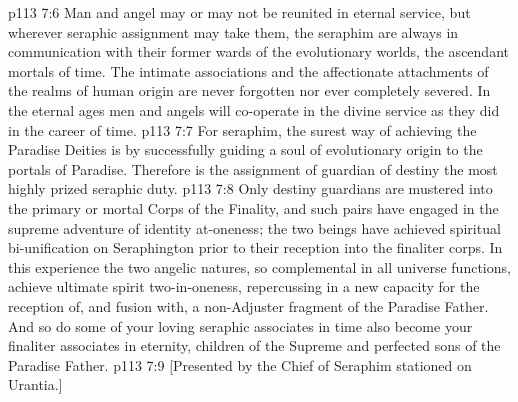 \vs p113 7:6 Man and angel may or may not be reunited in eternal service, but wherever seraphic assignment may take them, the seraphim are always in communication with their former wards of the evolutionary worlds, the ascendant mortals of time. The intimate associations and the affectionate attachments of the realms of human origin are never forgotten nor ever completely severed. In the eternal ages men and angels will co\hyp{}operate in the divine service as they did in the career of time.
\vs p113 7:7 \pc For seraphim, the surest way of achieving the Paradise Deities is by successfully guiding a soul of evolutionary origin to the portals of Paradise. Therefore is the assignment of guardian of destiny the most highly prized seraphic duty.
\vs p113 7:8 Only destiny guardians are mustered into the primary or mortal Corps of the Finality, and such pairs have engaged in the supreme adventure of identity at\hyp{}oneness; the two beings have achieved spiritual bi\hyp{}unification on Seraphington prior to their reception into the finaliter corps. In this experience the two angelic natures, so complemental in all universe functions, achieve ultimate spirit two\hyp{}in\hyp{}oneness, repercussing in a new capacity for the reception of, and fusion with, a non\hyp{}Adjuster fragment of the Paradise Father. And so do some of your loving seraphic associates in time also become your finaliter associates in eternity, children of the Supreme and perfected sons of the Paradise Father.
\vsetoff
\vs p113 7:9 [Presented by the Chief of Seraphim stationed on Urantia.]
\quizlink
